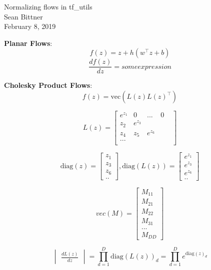 \documentclass[11pt]{article}
\begin{document}
\medskip                        %

\thispagestyle{plain}
\begin{center}                  %
{\Large Normalizing flows in tf\_utils} \\
Sean Bittner \\
February 8, 2019 \\
\end{center}

\textbf{Planar Flows}: \\
\[f(z) = z + h(w^\top z + b)\]
\[ \frac{d f(z)}{dz} = some expression \]

\textbf{Cholesky Product Flows}: \\
\[ f(z) = \text{vec}(L(z)L(z)^\top) \]

\[L(z) = \begin{bmatrix} e^{z_1} & 0 & ... &  0 \\ z_2 & e^{z_3} &  & \\ z_4 & z_5 & e^{z_6} &  & \\ ... & & & \\ \end{bmatrix}\]

\[\text{diag}(z) = \begin{bmatrix} z_1 \\ z_3 \\ z_6 \\ .. \end{bmatrix}, \text{diag}(L(z)) = \begin{bmatrix} e^{z_1} \\ e^{z_3} \\ e^{z_6} \\ .. \end{bmatrix} \]

\[vec(M) = \begin{bmatrix} M_{11} \\ M_{21} \\ M_{22} \\ M_{31} \\ ... \\ M_{DD} \end{bmatrix} \]

\[\begin{vmatrix} \frac{d L(z)}{dz} \end{vmatrix} = \prod_{d=1}^D \text{diag}(L(z))_d = \prod_{d=1}^D e^{\text{diag}(z)_d} \]
\end{document}
